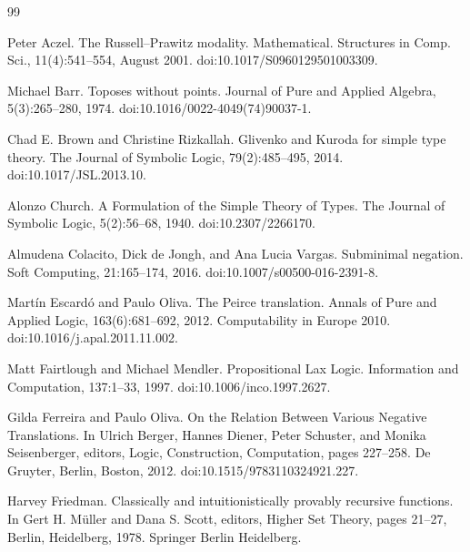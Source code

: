 \documentclass[10pt,a4paper]{article}
\begin{document}
\begin{thebibliography}{99}
\par\noindent    Peter Aczel.  The Russell–Prawitz modality.  Mathematical. Structures in Comp. Sci., 11(4):541–554, August 2001.  doi:10.1017/S0960129501003309.  

\par\noindent    Michael Barr.  Toposes without points.  Journal of Pure and Applied Algebra, 5(3):265–280, 1974.  doi:10.1016/0022-4049(74)90037-1.  

\par\noindent    Chad E. Brown and Christine Rizkallah.  Glivenko and Kuroda for simple type theory.  The Journal of Symbolic Logic, 79(2):485–495, 2014.  doi:10.1017/JSL.2013.10.  

\par\noindent    Alonzo Church.  A Formulation of the Simple Theory of Types.  The Journal of Symbolic Logic, 5(2):56–68, 1940.  doi:10.2307/2266170.  

\par\noindent    Almudena Colacito, Dick de Jongh, and Ana Lucia Vargas.  Subminimal negation.  Soft Computing, 21:165–174, 2016.  doi:10.1007/s00500-016-2391-8.  

\par\noindent    Martín Escardó and Paulo Oliva.  The Peirce translation.  Annals of Pure and Applied Logic, 163(6):681–692, 2012.  Computability in Europe 2010.  doi:10.1016/j.apal.2011.11.002.  

\par\noindent    Matt Fairtlough and Michael Mendler.  Propositional Lax Logic.  Information and Computation, 137:1–33, 1997.  doi:10.1006/inco.1997.2627.  

\par\noindent    Gilda Ferreira and Paulo Oliva.  On the Relation Between Various Negative Translations.  In Ulrich Berger, Hannes Diener, Peter Schuster, and Monika Seisenberger, editors, Logic, Construction, Computation, pages 227–258. De Gruyter, Berlin, Boston, 2012.  doi:10.1515/9783110324921.227.  

\par\noindent    Harvey Friedman.  Classically and intuitionistically provably recursive functions.  In Gert H. Müller and Dana S. Scott, editors, Higher Set Theory, pages 21–27, Berlin, Heidelberg, 1978. Springer Berlin Heidelberg.  


\end{thebibliography}
\end{document}
